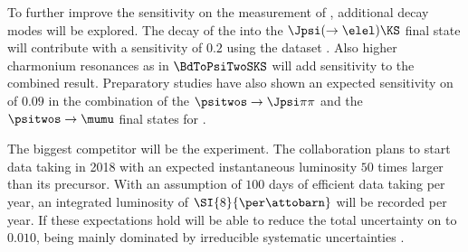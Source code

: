 To further improve the sensitivity on the measurement of \sintwobeta, additional
decay modes will be explored. The decay of the \Bd into the $\Jpsi (\to\elel)
\KS$ final state will contribute with a sensitivity of $\num{0.2}$ using the
\RunOne dataset \cite{Ramon}. Also
higher charmonium resonances as in $\BdToPsiTwoSKS$ will add sensitivity to the
combined result. Preparatory studies have also shown an expected sensitivity on
\sintwobeta of $\num{0.09}$ in the combination of the $\psitwos\to\Jpsi\pi\pi$
and the $\psitwos\to\mumu$ final states \cite{Mueller:2014} for \RunOne.


The biggest competitor will be the \BelleTwo experiment. The collaboration plans
to start data taking in 2018 with an expected instantaneous luminosity
$\num{50}$ times larger than its precursor. With an assumption of $\num{100}$
days of efficient data taking per year, an integrated luminosity of
$\SI{8}{\per\attobarn}$ will be recorded per year. If these expectations hold
\BelleTwo will be able to reduce the total uncertainty on \sintwobeta to
$\num{0.010}$, being mainly dominated by irreducible systematic uncertainties
\cite{Aushev:2010bq}.


